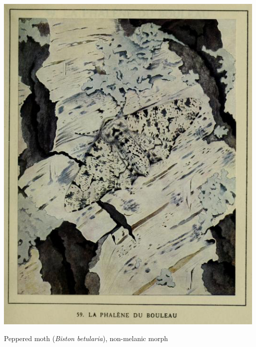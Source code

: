 \begin{marginfigure}[-3cm]
\begin{center}\includegraphics[width= \textwidth]{illustration_images/hitchhiking/Pepper_moth/lespapillonsdans01robe_0375_trimmed.png}
\end{center}
\caption{Peppered moth ({\it Biston betularia}), non-melanic morph  } \label{Peppered_moth}
\end{marginfigure}


